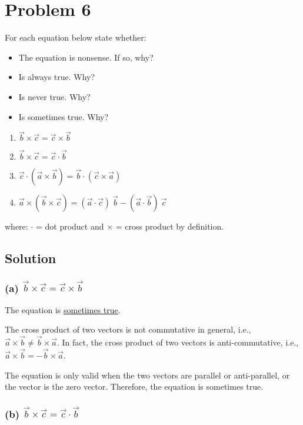 \section*{Problem 6}

For each equation below state whether:
\begin{itemize}
    \item The equation is nonsense. If so, why?
    \item Is always true. Why?
    \item Is never true. Why?
    \item Is sometimes true. Why?
\end{itemize}

\begin{enumerate}[label = (\alph*)]
    \item \( \vec{b} \times \vec{c} = \vec{c} \times \vec{b} \)
    \item \( \vec{b} \times \vec{c} = \vec{c} \cdot \vec{b} \)
    \item \( \vec{c} \cdot (\vec{a} \times \vec{b}) = \vec{b} \cdot (\vec{c} \times \vec{a}) \)
    \item \( \vec{a} \times (\vec{b} \times \vec{c}) = (\vec{a} \cdot \vec{c})\ \vec{b} - (\vec{a} \cdot \vec{b})\ \vec{c} \)
\end{enumerate}
where: \( \cdot \) = dot product and \( \times \) = cross product by definition.

\subsection*{Solution}

\subsubsection*{(a) \( \vec{b} \times \vec{c} = \vec{c} \times \vec{b} \)}

The equation is \underline{sometimes true}.

The cross product of two vectors is not commutative in general, i.e., \( \vec{a} \times \vec{b} \neq \vec{b} \times \vec{a} \).
In fact, the cross product of two vectors is anti-commutative, i.e., \( \vec{a} \times \vec{b} = -\vec{b} \times \vec{a} \).

The equation is only valid when the two vectors are parallel or anti-parallel, or the vector is the zero vector.
Therefore, the equation is sometimes true.

\subsubsection*{(b) \( \vec{b} \times \vec{c} = \vec{c} \cdot \vec{b} \)}


